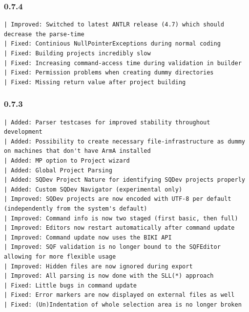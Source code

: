 \documentclass[twoside=false]{scrbook}
\begin{document}
	\subsubsection*{0.7.4}
	\begin{lstlisting}[breaklines=true]
| Improved: Switched to latest ANTLR release (4.7) which should decrease the parse-time
| Fixed: Continious NullPointerExceptions during normal coding
| Fixed: Building projects incredibly slow
| Fixed: Increasing command-access time during validation in builder
| Fixed: Permission problems when creating dummy directories
| Fixed: Missing return value after project building
	\end{lstlisting}
	
	\subsubsection*{0.7.3}
	\begin{lstlisting}[breaklines=true]
| Added: Parser testcases for improved stability throughout development
| Added: Possibility to create necessary file-infrastructure as dummy on machines that don't have ArmA installed
| Added: MP option to Project wizard
| Added: Global Project Parsing
| Added: SQDev Project Nature for identifying SQDev projects properly
| Added: Custom SQDev Navigator (experimental only)
| Improved: SQDev projects are now encoded with UTF-8 per default (independently from the system's default)
| Improved: Command info is now two staged (first basic, then full)
| Improved: Editors now restart automatically after command update
| Improved: Command update now uses the BIKI API
| Improved: SQF validation is no longer bound to the SQFEditor allowing for more flexible usage
| Improved: Hidden files are now ignored during export
| Improved: All parsing is now done with the SLL(*) approach
| Fixed: Little bugs in command update
| Fixed: Error markers are now displayed on external files as well
| Fixed: (Un)Indentation of whole selection area is no longer broken
	\end{lstlisting}
	
\end{document}
